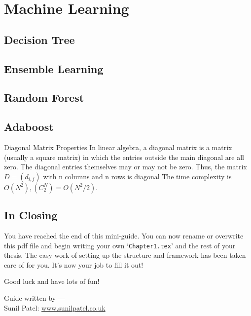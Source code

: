 \chapter{Machine Learning} %

\label{Chapter3} %


\section{Decision Tree}
\section{Ensemble Learning}
\section{Random Forest}
\section{Adaboost}

\begin{compactitem}

\item Diagonal Matrix Properties
In linear algebra, a diagonal matrix is a matrix (usually a square matrix) in which
the entries outside the main diagonal are all zero. The diagonal entries themselves
may or may not be zero. Thus, the matrix $D = (d_{i,j})$ with n columns and n rows is diagonal
The time complexity is $O(N^2),  (C_2^N) = O(N^2/2)$.
\end{compactitem}


\section{In Closing}

You have reached the end of this mini-guide. You can now rename or overwrite this pdf file and begin writing your own `\texttt{Chapter1.tex}' and the rest of your thesis. The easy work of setting up the structure and framework has been taken care of for you. It's now your job to fill it out!

Good luck and have lots of fun!

\begin{flushright}
Guide written by ---\\
Sunil Patel: \href{http://www.sunilpatel.co.uk}{www.sunilpatel.co.uk}
\end{flushright}
